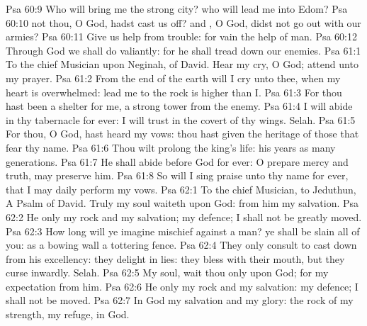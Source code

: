\vs Psa 60:9 Who will bring me  the strong city? who will lead me into Edom?
\vs Psa 60:10  not thou, O God,  hadst cast us off? and , O God,  didst not go out with our armies?
\vs Psa 60:11 Give us help from trouble: for vain  the help of man.
\vs Psa 60:12 Through God we shall do valiantly: for he  shall tread down our enemies.
\vs Psa 61:1 To the chief Musician upon Neginah,  of David. Hear my cry, O God; attend unto my prayer.
\vs Psa 61:2 From the end of the earth will I cry unto thee, when my heart is overwhelmed: lead me to the rock  is higher than I.
\vs Psa 61:3 For thou hast been a shelter for me,  a strong tower from the enemy.
\vs Psa 61:4 I will abide in thy tabernacle for ever: I will trust in the covert of thy wings. Selah.
\vs Psa 61:5 For thou, O God, hast heard my vows: thou hast given  the heritage of those that fear thy name.
\vs Psa 61:6 Thou wilt prolong the king's life:  his years as many generations.
\vs Psa 61:7 He shall abide before God for ever: O prepare mercy and truth,  may preserve him.
\vs Psa 61:8 So will I sing praise unto thy name for ever, that I may daily perform my vows.
\vs Psa 62:1 To the chief Musician, to Jeduthun, A Psalm of David. Truly my soul waiteth upon God: from him  my salvation.
\vs Psa 62:2 He only  my rock and my salvation;  my defence; I shall not be greatly moved.
\vs Psa 62:3 How long will ye imagine mischief against a man? ye shall be slain all of you: as a bowing wall  a tottering fence.
\vs Psa 62:4 They only consult to cast  down from his excellency: they delight in lies: they bless with their mouth, but they curse inwardly. Selah.
\vs Psa 62:5 My soul, wait thou only upon God; for my expectation  from him.
\vs Psa 62:6 He only  my rock and my salvation:  my defence; I shall not be moved.
\vs Psa 62:7 In God  my salvation and my glory: the rock of my strength,  my refuge,  in God.
